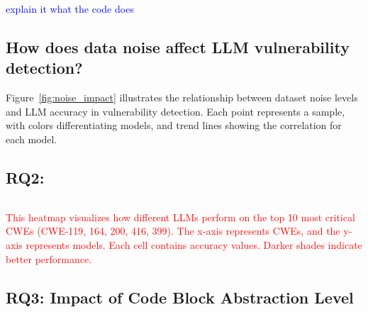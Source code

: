 \documentclass[sigconf,review,anonymous]{acmart}
\begin{document}
\begin{verbatim}
\end{verbatim}
\textcolor{blue}{explain it what the code does}

\subsection{How does data noise affect LLM vulnerability detection?}

Figure~\ref{fig:noise_impact} illustrates the relationship between dataset noise levels and LLM accuracy in vulnerability detection. Each point represents a sample, with colors differentiating models, and trend lines showing the correlation for each model.
\subsection{RQ2:}
\begin{verbatim}

\end{verbatim}


\textcolor{red}{This heatmap visualizes how different LLMs perform on the top 10 most critical CWEs (CWE-119, 164, 200, 416, 399). The x-axis represents CWEs, and the y-axis represents models. Each cell contains accuracy values. Darker shades indicate better performance.}


\subsection{RQ3: Impact of Code Block Abstraction Level}
\end{document}
